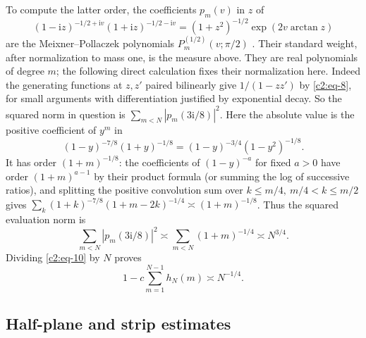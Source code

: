 To compute the latter order, the coefficients \(p_m(v)\) in \(z\) of
\[
 (1-\mathrm i z)^{-1/2+\mathrm i v}(1+\mathrm i z)^{-1/2-\mathrm i v}
 =(1+z^2)^{-1/2}\exp(2v\arctan z)
\]
are the Meixner--Pollaczek polynomials \(P_m^{(1/2)}(v;\pi/2)\)
\cite[18.23.7 and 18.19.6--18.19.9]{DLMF}. Their standard weight,
after normalization to mass one, is the measure above. They are real
polynomials of degree \(m\); the following direct calculation fixes their
normalization here. Indeed the generating functions at \(z,z'\) paired bilinearly give \(1/(1-zz')\) by \eqref{c2:eq-8}, for small arguments with differentiation justified by exponential decay. So the squared norm in question is \(\sum_{m<N}|p_m(3\mathrm i/8)|^2\). Here the absolute value is the positive coefficient of \(y^m\) in
\[
 (1-y)^{-7/8}(1+y)^{-1/8}=(1-y)^{-3/4}(1-y^2)^{-1/8}.
\]
It has order \((1+m)^{-1/8}\): the coefficients of \((1-y)^{-a}\) for fixed \(a>0\) have order \((1+m)^{a-1}\) by their product formula (or summing the log of successive ratios), and splitting the positive convolution sum over \(k\le m/4,\ m/4<k\le m/2\) gives
$\sum_k(1+k)^{-7/8}(1+m-2k)^{-1/4}\asymp(1+m)^{-1/8}$.
Thus the squared evaluation norm is
\[
 \sum_{m<N}|p_m(3\mathrm i/8)|^2
 \asymp\sum_{m<N}(1+m)^{-1/4}\asymp N^{3/4}.
\]
Dividing \eqref{c2:eq-10} by $N$ proves
\begin{equation}
 1-c\sum_{m=1}^{N-1}h_N(m)\asymp N^{-1/4}.                                  \label{c2:eq-11}
\end{equation}

\subsection{Half-plane and strip estimates}

